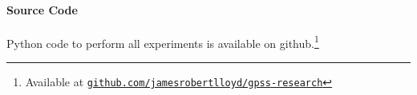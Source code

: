 \documentclass{article}
\begin{document}
\paragraph{Source Code}
Python code to perform all experiments is available on github.\footnote{Available at 
\href{http://www.github.com/jamesrobertlloyd/gpss-research}
{\texttt{github.com/jamesrobertlloyd/gpss-research}}}







\end{document}
